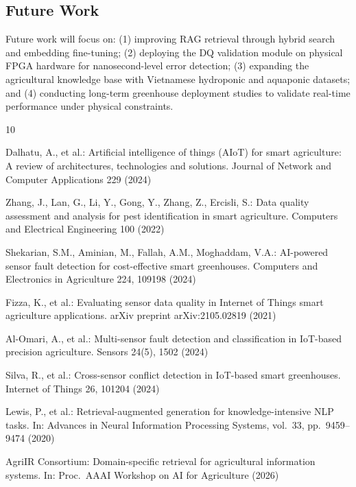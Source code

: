 \documentclass[runningheads]{llncs}
\begin{document}
\subsection{Future Work}
Future work will focus on: (1) improving RAG retrieval through hybrid search and embedding fine-tuning; (2) deploying the DQ validation module on physical FPGA hardware for nanosecond-level error detection; (3) expanding the agricultural knowledge base with Vietnamese hydroponic and aquaponic datasets; and (4) conducting long-term greenhouse deployment studies to validate real-time performance under physical constraints.

\begin{thebibliography}{10}

Dalhatu, A., et al.: Artificial intelligence of things (AIoT) for smart agriculture: A review of architectures, technologies and solutions. Journal of Network and Computer Applications 229 (2024)

Zhang, J., Lan, G., Li, Y., Gong, Y., Zhang, Z., Ercisli, S.: Data quality assessment and analysis for pest identification in smart agriculture. Computers and Electrical Engineering 100 (2022)

Shekarian, S.M., Aminian, M., Fallah, A.M., Moghaddam, V.A.: AI-powered sensor fault detection for cost-effective smart greenhouses. Computers and Electronics in Agriculture 224, 109198 (2024)

Fizza, K., et al.: Evaluating sensor data quality in Internet of Things smart agriculture applications. arXiv preprint arXiv:2105.02819 (2021)

Al-Omari, A., et al.: Multi-sensor fault detection and classification in IoT-based precision agriculture. Sensors 24(5), 1502 (2024)

Silva, R., et al.: Cross-sensor conflict detection in IoT-based smart greenhouses. Internet of Things 26, 101204 (2024)

Lewis, P., et al.: Retrieval-augmented generation for knowledge-intensive NLP tasks. In: Advances in Neural Information Processing Systems, vol.~33, pp.~9459--9474 (2020)

AgriIR Consortium: Domain-specific retrieval for agricultural information systems. In: Proc.\ AAAI Workshop on AI for Agriculture (2026)


\end{thebibliography}
\end{document}

